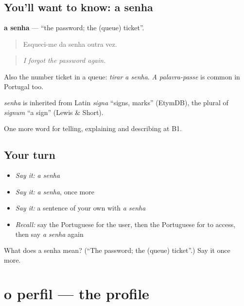 \subsection*{You'll want to know: a senha}
\textbf{a senha} — \textquotedblleft{}the password; the (queue) ticket\textquotedblright{}.

\begin{quote}
Esqueci-me da senha outra vez.
\end{quote}

\begin{quote}
\emph{I forgot the password again.}
\end{quote}

Also the number ticket in a queue: \emph{tirar a senha}. \emph{A palavra-passe} is common in Portugal too.

\begin{cousinweb}
\emph{senha} is inherited from Latin \emph{signa} \textquotedblleft{}signs, marks\textquotedblright{} (EtymDB), the plural of \emph{signum} \textquotedblleft{}a sign\textquotedblright{} (Lewis \& Short).
\end{cousinweb}

\begin{grammarlens}[title={What you've built}]
One more word for telling, explaining and describing at B1.
\end{grammarlens}

\subsection*{Your turn}
\begin{itemize}
\raggedright
  \item \emph{Say it:} \emph{a senha}
  \item \emph{Say it:} \emph{a senha}, once more
  \item \emph{Say it:} a sentence of your own with \emph{a senha}
  \item \emph{Recall:} say the Portuguese for the user, then the Portuguese for to access, then say \emph{a senha} again
\end{itemize}

\begin{tcolorbox}[breakable,colback=teal!4,colframe=teal!35!black,title={Before you move on}]
What does a senha mean? (\textquotedblleft{}The password; the (queue) ticket\textquotedblright{}.) Say it once more.
\end{tcolorbox}
\section[o perfil]{o perfil — the profile}

